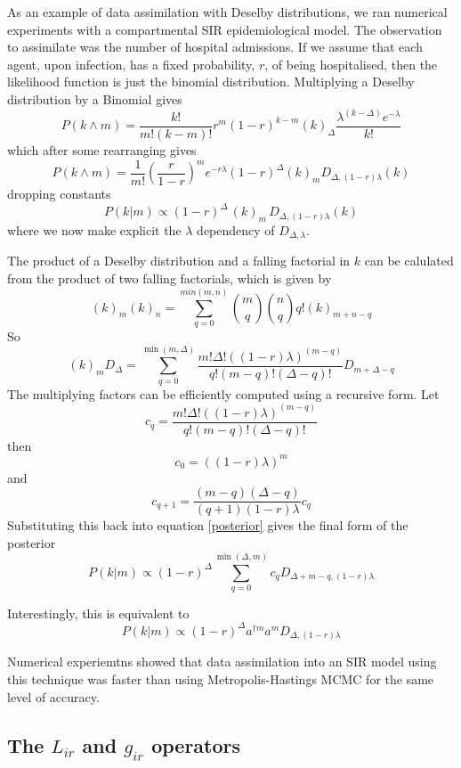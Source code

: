 \documentclass[letterpaper,twocolumn,10pt]{article}
\begin{document}
As an example of data assimilation with Deselby distributions, we ran numerical experiments with a compartmental SIR epidemiological model. The observation to assimilate was the number of hospital admissions. If we assume that each agent, upon infection, has a fixed probability, $r$, of being hospitalised, then the likelihood function is just the binomial distribution. Multiplying a Deselby distribution by a Binomial gives
\[
P(k \wedge m) = \frac{k!}{m!(k-m)!}r^m(1-r)^{k-m} (k)_\Delta \frac{\lambda^{(k-\Delta)}e^{-\lambda}}{k!}
\]
which after some rearranging gives
\[
P(k \wedge m) = \frac{1}{m!}\left(\frac{r}{1-r}\right)^m e^{-r\lambda} (1-r)^\Delta (k)_m D_{\Delta,(1-r)\lambda}(k)
\]
dropping constants
\begin{equation}
P(k|m) \propto (1-r)^\Delta \, (k)_m \,D_{\Delta,(1-r)\lambda}(k)
\label{posterior}
\end{equation}
where we now make explicit the $\lambda$ dependency of $D_{\Delta,\lambda}$.

The product of a Deselby distribution and a falling factorial in $k$ can be calulated from the product of two falling factorials, which is given by
\[
(k)_m(k)_n = \sum_{q=0}^{min(m,n)} {m \choose q}{n \choose q}q!(k)_{m+n-q}
\]
So
\[
(k)_m D_\Delta = \sum_{q=0}^{\min(m,\Delta)} \frac{m!\Delta!\left((1-r)\lambda\right)^{(m-q)}}{q!(m-q)!(\Delta-q)!} D_{m+\Delta-q}
\]
The multiplying factors can be efficiently computed using a recursive form. Let
\[
c_q = \frac{m!\Delta!\left((1-r)\lambda\right)^{(m-q)}}{q!(m-q)!(\Delta-q)!}
\]
then
\[
c_0 = ((1-r)\lambda)^m
\]
and
\[
c_{q+1} = \frac{(m-q)(\Delta - q)}{(q+1)(1-r)\lambda} c_q
\]
Substituting this back into equation \ref{posterior} gives the final form of the posterior
\begin{equation}
P(k|m) \propto (1-r)^\Delta \sum_{q=0}^{\min(\Delta,m)} c_q D_{\Delta+m-q,(1-r)\lambda}
\end{equation}

Interestingly, this is equivalent to
\begin{equation}
P(k|m) \propto (1-r)^\Delta a^{\dag m}a^m D_{\Delta,(1-r)\lambda}
\end{equation}


Numerical experiemtns showed that data assimilation into an SIR model using this technique was faster than using Metropolis-Hastings MCMC for the same level of accuracy.

\subsection{The $L_{ir}$ and $g_{ir}$ operators}
\end{document}
